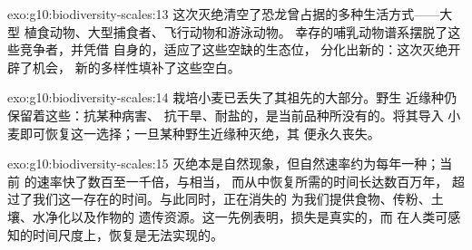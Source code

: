 \begin{solution}{exo:g10:biodiversity-scales:13}
这次灭绝清空了恐龙曾占据的多种生活方式——大型
植食动物、大型捕食者、飞行动物和游泳动物。
幸存的哺乳动物谱系摆脱了这些竞争者，并凭借
自身的，适应了这些空缺的生态位，
分化出新的：这次灭绝开辟了机会，
新的多样性填补了这些空白。
\end{solution}

\begin{solution}{exo:g10:biodiversity-scales:14}
栽培小麦已丢失了其祖先的大部分。野生
近缘种仍保留着这些：抗某种病害、
抗干旱、耐盐的，是当前品种所没有的。将其导入
小麦即可恢复这一选择；一旦某种野生近缘种灭绝，其
便永久丧失。
\end{solution}

\begin{solution}{exo:g10:biodiversity-scales:15}
灭绝本是自然现象，但自然速率约为每年一种；当前
的速率快了数百至一千倍，与相当，
而从中恢复所需的时间长达数百万年，
超过了我们这一存在的时间。与此同时，正在消失的
为我们提供食物、传粉、土壤、水净化以及作物的
遗传资源。这一先例表明，损失是真实的，而
在人类可感知的时间尺度上，恢复是无法实现的。
\end{solution}


